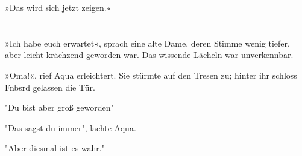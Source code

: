 »Das wird sich jetzt zeigen.«


\chapter{}

»Ich habe euch erwartet«, sprach eine alte Dame, deren Stimme wenig tiefer, aber leicht krächzend geworden war. Das wissende Lächeln war unverkennbar.

»Oma!«, rief Aqua erleichtert. Sie stürmte auf den Tresen zu; hinter ihr schloss Fnbsrd gelassen die Tür.

"Du bist aber groß geworden"

"Das sagst du immer", lachte Aqua.

"Aber diesmal ist es wahr."






